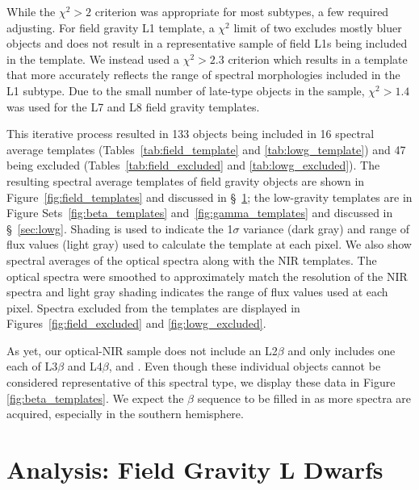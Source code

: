 \documentclass[12pt,preprint]{aastex}
\begin{document}
While the $\chi^2 > 2$ criterion was appropriate for most subtypes, a few required adjusting.
For field gravity L1 template, a $\chi^2$ limit of two excludes mostly bluer objects and does not result in a representative sample of field L1s being included in the template.
We instead used a $\chi^2 > 2.3$ criterion which results in a template that more accurately reflects the range of spectral morphologies included in the L1 subtype.
Due to the small number of late-type objects in the sample, $\chi^2 > 1.4$ was used for the L7 and L8 field gravity templates.

This iterative process resulted in 133 objects being included in 16 spectral average templates (Tables~\ref{tab:field_template} and \ref{tab:lowg_template}) and 47 being excluded (Tables~\ref{tab:field_excluded} and \ref{tab:lowg_excluded}).
The resulting spectral average templates of field gravity objects are shown in Figure~\ref{fig:field_templates} and discussed in \S~\ref{sec:fieldg}; the low-gravity templates are in Figure Sets~\ref{fig:beta_templates} and~\ref{fig:gamma_templates} and discussed in \S~\ref{sec:lowg}. 
Shading is used to indicate the 1$\sigma$ variance (dark gray) and range of flux values (light gray) used to calculate the template at each pixel.
We also show spectral averages of the optical spectra along with the NIR templates. The optical spectra were smoothed to approximately match the resolution of the NIR spectra and light gray shading indicates the range of flux values used at each pixel.
Spectra excluded from the templates are displayed in Figures~\ref{fig:field_excluded} and \ref{fig:lowg_excluded}.

As yet, our optical-NIR sample does not include an L2$\beta$ and only includes one each of L3$\beta$ and L4$\beta$,  and  \citep{Cruz09_lowg}.
Even though these individual objects cannot be considered representative of this spectral type, we display these data in Figure \ref{fig:beta_templates}.
We expect the $\beta$ sequence to be filled in as more spectra are acquired, especially in the southern hemisphere.

\clearpage
\section{Analysis: Field Gravity L Dwarfs}
\label{sec:fieldg}
\end{document}

